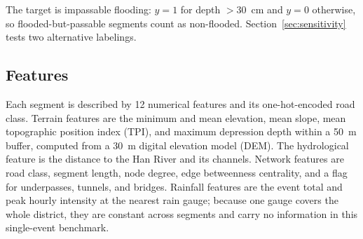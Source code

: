 The target is impassable flooding: $y=1$ for depth $>30$~cm and $y=0$ otherwise, so flooded-but-passable segments count as non-flooded. Section~\ref{sec:sensitivity} tests two alternative labelings.

\subsection{Features}
Each segment is described by 12 numerical features and its one-hot-encoded road class. Terrain features are the minimum and mean elevation, mean slope, mean topographic position index (TPI), and maximum depression depth within a 50~m buffer, computed from a 30~m digital elevation model (DEM). The hydrological feature is the distance to the Han River and its channels. Network features are road class, segment length, node degree, edge betweenness centrality, and a flag for underpasses, tunnels, and bridges. Rainfall features are the event total and peak hourly intensity at the nearest rain gauge; because one gauge covers the whole district, they are constant across segments and carry no information in this single-event benchmark.

